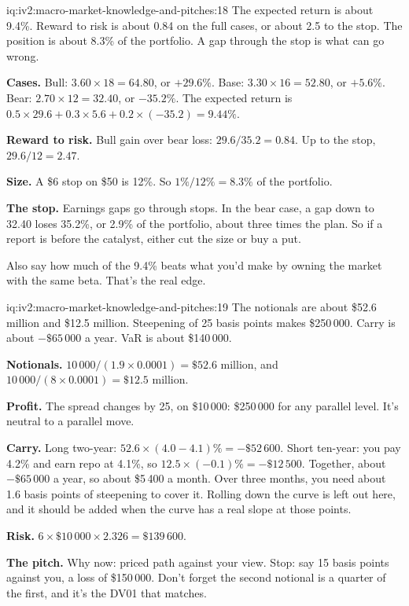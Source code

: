 \begin{solution}{iq:iv2:macro-market-knowledge-and-pitches:18}
The expected return is about 9.4\%. Reward to risk is about 0.84 on the full cases, or about 2.5 to the stop. The position is about 8.3\% of the portfolio. A gap through the stop is what can go wrong.

\textbf{Cases.} Bull: $3.60 \times 18 = 64.80$, or $+29.6\%$. Base: $3.30 \times 16 = 52.80$, or $+5.6\%$. Bear: $2.70 \times 12 = 32.40$, or $-35.2\%$. The expected return is $0.5 \times 29.6 + 0.3 \times 5.6 + 0.2 \times (-35.2) = 9.44\%$.

\textbf{Reward to risk.} Bull gain over bear loss: $29.6/35.2 = 0.84$. Up to the stop, $29.6/12 = 2.47$.

\textbf{Size.} A \$6 stop on \$50 is 12\%. So $1\%/12\% = 8.3\%$ of the portfolio.

\textbf{The stop.} Earnings gaps go through stops. In the bear case, a gap down to 32.40 loses 35.2\%, or 2.9\% of the portfolio, about three times the plan. So if a report is before the catalyst, either cut the size or buy a put.

Also say how much of the 9.4\% beats what you'd make by owning the market with the same beta. That's the real edge.

\end{solution}

\begin{solution}{iq:iv2:macro-market-knowledge-and-pitches:19}
The notionals are about \$52.6 million and \$12.5 million. Steepening of 25 basis points makes \$250\,000. Carry is about $-\$65\,000$ a year. VaR is about \$140\,000.

\textbf{Notionals.} $10\,000/(1.9 \times 0.0001) = \$52.6$ million, and $10\,000/(8 \times 0.0001) = \$12.5$ million.

\textbf{Profit.} The spread changes by 25, on \$10\,000: \$250\,000 for any parallel level. It's neutral to a parallel move.

\textbf{Carry.} Long two-year: $52.6 \times (4.0 - 4.1)\% = -\$52\,600$. Short ten-year: you pay 4.2\% and earn repo at 4.1\%, so $12.5 \times (-0.1)\% = -\$12\,500$. Together, about $-\$65\,000$ a year, so about \$5\,400 a month. Over three months, you need about 1.6 basis points of steepening to cover it. Rolling down the curve is left out here, and it should be added when the curve has a real slope at those points.

\textbf{Risk.} $6 \times \$10\,000 \times 2.326 = \$139\,600$.

\textbf{The pitch.} Why now: priced path against your view. Stop: say 15 basis points against you, a loss of \$150\,000. Don't forget the second notional is a quarter of the first, and it's the DV01 that matches.

\end{solution}

